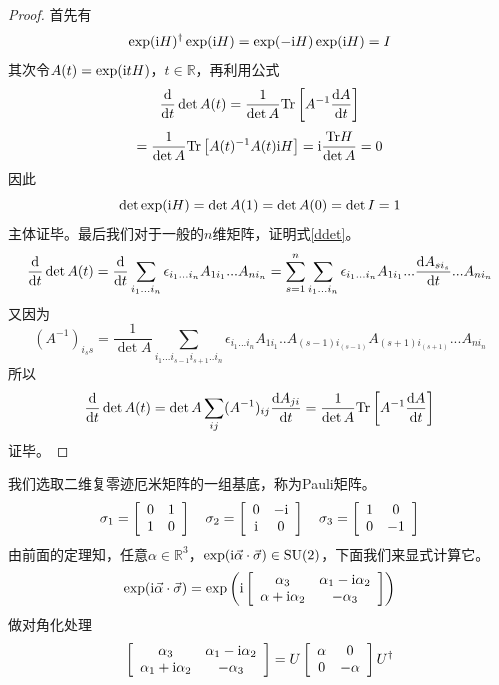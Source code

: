 \begin{proof}
    首先有
    $$\exp(\mathrm{i} H)^\dagger \exp(\mathrm{i} H)=\exp(-\mathrm{i} H)\exp(\mathrm{i} H)=I$$
    其次令$A(t)=\exp(\mathrm{i} tH)$，$t\in\mathbb{R}$，再利用公式
    \begin{equation}\label{ddet}
        \frac{\mathrm{d}}{\mathrm{d} t}\det A(t)=\frac{1}{\det A}\mathrm{Tr}\left[A^{-1}\frac{\mathrm{d} A}{\mathrm{d} t}\right]
    \end{equation}
    $$=\frac{1}{\det A}\mathrm{Tr}\left[A(t)^{-1}A(t)\mathrm{i} H\right]=\mathrm{i}\frac{\mathrm{Tr} H}{\det A}=0$$
    因此
    $$\det\exp(\mathrm{i} H)=\det A(1)=\det A(0)=\det I=1$$
    主体证毕。最后我们对于一般的$n$维矩阵，证明式\ref{ddet}。
    $$\frac{\mathrm{d}}{\mathrm{d} t}\det A(t)=\frac{\mathrm{d}}{\mathrm{d} t}\sum_{i_1...i_n}\epsilon_{i_1...i_n}A_{1i_1}...A_{ni_n}=\sum_{s=1}^n\sum_{i_1...i_n}\epsilon_{i_1...i_n}A_{1i_1}...\frac{\mathrm{d} A_{si_s}}{\mathrm{d} t}...A_{ni_n}$$
    又因为
    $$(A^{-1})_{i_s s}=\frac{1}{\det A}\sum_{i_1...i_{s-1}i_{s+1}..i_n}\epsilon_{i_1...i_n}A_{1i_1}..A_{(s-1)i_{(s-1)}}A_{(s+1)i_{(s+1)}}...A_{ni_n}$$
    所以
    $$\frac{\mathrm{d}}{\mathrm{d} t}\det A(t)=\det A\sum_{ij}(A^{-1})_{ij}\frac{\mathrm{d} A_{ji}}{\mathrm{d} t}=\frac{1}{\det A}\mathrm{Tr}\left[A^{-1}\frac{\mathrm{d} A}{\mathrm{d} t}\right]$$
    证毕。
\end{proof}
我们选取二维复零迹厄米矩阵的一组基底，称为Pauli矩阵。
$$\sigma_1=\left[\begin{array}{cc}
    0&1\\
    1&0
\end{array}\right]\quad \sigma_2=\left[\begin{array}{cc}
    0&-\mathrm{i}\\
    \mathrm{i}&0
\end{array}\right]\quad \sigma_3=\left[\begin{array}{cc}
    1&0\\
    0&-1
\end{array}\right]$$
由前面的定理知，任意$\alpha\in\mathbb{R}^3$，$\exp(\mathrm{i}\vec{\alpha}\cdot\vec{\sigma})\in\mathrm{SU}(2)$，下面我们来显式计算它。
$$\exp(\mathrm{i}\vec{\alpha}\cdot\vec{\sigma})=\exp\left(\mathrm{i}\left[\begin{array}{cc}
    \alpha_3&\alpha_1-\mathrm{i}\alpha_2\\
    \alpha+\mathrm{i}\alpha_2&-\alpha_3
\end{array}\right]\right)$$
做对角化处理
$$\left[\begin{array}{cc}
    \alpha_3&\alpha_1-\mathrm{i}\alpha_2\\
    \alpha_1+\mathrm{i}\alpha_2&-\alpha_3
\end{array}\right]=U\left[\begin{array}{cc}
    \alpha&0\\
    0&-\alpha
\end{array}\right]U^\dagger$$
